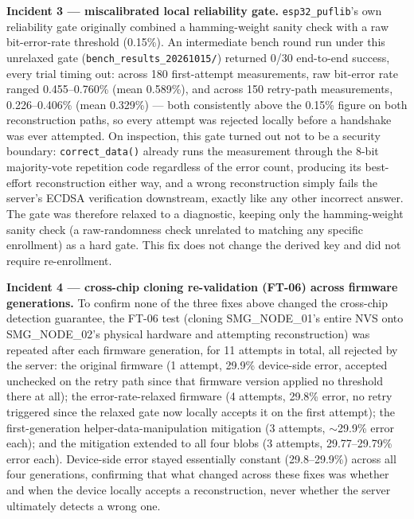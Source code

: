 \documentclass[12pt]{article}
\begin{document}
\textbf{Incident 3 --- miscalibrated local reliability gate.} \texttt{esp32\_puflib}'s own reliability gate originally combined a hamming-weight sanity check with a raw bit-error-rate threshold (0.15\%). An intermediate bench round run under this unrelaxed gate (\texttt{bench\_results\_20261015/}) returned 0/30 end-to-end success, every trial timing out: across 180 first-attempt measurements, raw bit-error rate ranged 0.455--0.760\% (mean 0.589\%), and across 150 retry-path measurements, 0.226--0.406\% (mean 0.329\%) --- both consistently above the 0.15\% figure on both reconstruction paths, so every attempt was rejected locally before a handshake was ever attempted. On inspection, this gate turned out not to be a security boundary: \texttt{correct\_data()} already runs the measurement through the 8-bit majority-vote repetition code regardless of the error count, producing its best-effort reconstruction either way, and a wrong reconstruction simply fails the server's ECDSA verification downstream, exactly like any other incorrect answer. The gate was therefore relaxed to a diagnostic, keeping only the hamming-weight sanity check (a raw-randomness check unrelated to matching any specific enrollment) as a hard gate. This fix does not change the derived key and did not require re-enrollment.

\textbf{Incident 4 --- cross-chip cloning re-validation (FT-06) across firmware generations.} To confirm none of the three fixes above changed the cross-chip detection guarantee, the FT-06 test (cloning SMG\_NODE\_01's entire NVS onto SMG\_NODE\_02's physical hardware and attempting reconstruction) was repeated after each firmware generation, for 11 attempts in total, all rejected by the server: the original firmware (1 attempt, 29.9\% device-side error, accepted unchecked on the retry path since that firmware version applied no threshold there at all); the error-rate-relaxed firmware (4 attempts, 29.8\% error, no retry triggered since the relaxed gate now locally accepts it on the first attempt); the first-generation helper-data-manipulation mitigation (3 attempts, $\sim$29.9\% error each); and the mitigation extended to all four blobs (3 attempts, 29.77--29.79\% error each). Device-side error stayed essentially constant (29.8--29.9\%) across all four generations, confirming that what changed across these fixes was whether and when the device locally accepts a reconstruction, never whether the server ultimately detects a wrong one.
\end{document}
